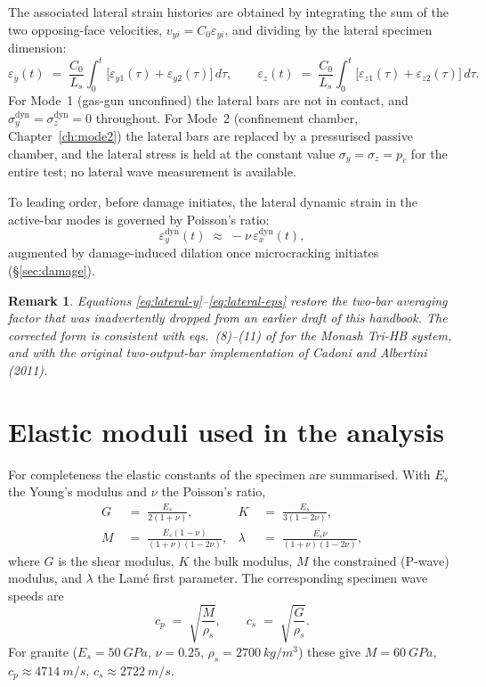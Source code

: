 \documentclass[11pt,a4paper,openany]{book}
\providecommand{\SI}[2]{\qty{#1}{#2}}
\theoremstyle{handbook}
\newtheorem{remark}{Remark}[chapter]
\newcommand{\sig}{\sigma}
\newcommand{\eps}{\varepsilon}
\newcommand{\Cz}{C_0}
\newcommand{\Ls}{L_s}
\begin{document}
The associated lateral strain histories are obtained by integrating the
sum of the two opposing-face velocities, $v_{yi}=\Cz\eps_{yi}$, and dividing
by the lateral specimen dimension:
\begin{equation}
  \eps_y(t) \;=\; \frac{\Cz}{\Ls}\!\int_{0}^{t}\!\bigl[\eps_{y1}(\tau)+\eps_{y2}(\tau)\bigr]\,d\tau,
  \qquad
  \eps_z(t) \;=\; \frac{\Cz}{\Ls}\!\int_{0}^{t}\!\bigl[\eps_{z1}(\tau)+\eps_{z2}(\tau)\bigr]\,d\tau.
  \label{eq:lateral-eps}
\end{equation}
For Mode~1 (gas-gun unconfined) the lateral bars are not in contact, and
$\sig_y^{\text{dyn}}=\sig_z^{\text{dyn}}=0$ throughout. For Mode~2
(confinement chamber, Chapter~\ref{ch:mode2}) the lateral bars are
replaced by a pressurised passive chamber, and the lateral stress is held
at the constant value $\sig_y=\sig_z=p_c$ for the entire test; no lateral
wave measurement is available.

To leading order, before damage initiates, the lateral dynamic strain in
the active-bar modes is governed by Poisson's ratio:
\begin{equation}
  \eps_y^{\text{dyn}}(t) \;\approx\; -\nu\,\eps_x^{\text{dyn}}(t),
\end{equation}
augmented by damage-induced dilation once microcracking initiates
(\S\ref{sec:damage}).

\begin{remark}
Equations \eqref{eq:lateral-y}--\eqref{eq:lateral-eps} restore the
two-bar averaging factor that was inadvertently dropped from an earlier
draft of this handbook. The corrected form is consistent with eqs.~(8)--(11)
of \cite{Liu2019} for the Monash Tri-HB system, and with the original
two-output-bar implementation of Cadoni and Albertini (2011).
\end{remark}

\section{Elastic moduli used in the analysis}

For completeness the elastic constants of the specimen are summarised. With
$E_s$ the Young's modulus and $\nu$ the Poisson's ratio,
\begin{align}
  G   &\;=\; \frac{E_s}{2(1+\nu)},
  & K &\;=\; \frac{E_s}{3(1-2\nu)},  \label{eq:G-K}\\[4pt]
  M   &\;=\; \frac{E_s(1-\nu)}{(1+\nu)(1-2\nu)},
  & \lambda &\;=\; \frac{E_s\nu}{(1+\nu)(1-2\nu)}, \label{eq:M-lambda}
\end{align}
where $G$ is the shear modulus, $K$ the bulk modulus, $M$ the constrained
(P-wave) modulus, and $\lambda$ the Lamé first parameter. The corresponding
specimen wave speeds are
\begin{equation}
  c_p \;=\; \sqrt{\frac{M}{\rho_s}},
  \qquad
  c_s \;=\; \sqrt{\frac{G}{\rho_s}}.
  \label{eq:cp-cs}
\end{equation}
For granite ($E_s=\SI{50}{GPa}$, $\nu=0.25$, $\rho_s=\SI{2700}{kg/m^{3}}$)
these give $M=\SI{60}{GPa}$, $c_p\approx\SI{4714}{m/s}$,
$c_s\approx\SI{2722}{m/s}$.
\end{document}
